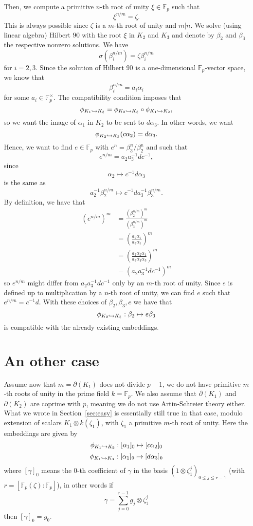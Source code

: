 \documentclass[a4paper,11pt]{article}
\begin{document}
Then, we compute a primitive $n$-th root of unity $\xi\in\mathbb{F}_p$ such that
\[
  \xi^{n/m}=\zeta.
\]
This is always possible since $\zeta$ is a $m$-th root of unity and $m|n$.
We solve (using linear algebra) Hilbert $90$ with the root
$\xi$ in $K_2$ and $K_3$ and denote by $\beta_2$ and $\beta_3$ the respective
nonzero solutions. We have
\[
  \sigma(\beta_i^{n/m})=\zeta\beta_i^{n/m}
\] for $i=2,3$. Since the solution of Hilbert $90$ is a one-dimensional
$\mathbb{F}_p$-vector space, we know that
\[
  \beta_i^{n/m}=a_i\alpha_i
\] for some $a_i\in\mathbb{F}_p^\times$. The compatibility condition imposes that 
\[
  \phi_{K_1\hookrightarrow K_3}=\phi_{K_2\hookrightarrow K_3}\circ\phi_{K_1\hookrightarrow K_2},
\]
so we want the image of $\alpha_1$ in $K_2$ to be sent to $d\alpha_3$. In other
words, we want
\[
  \phi_{K_2\hookrightarrow K_3}(c\alpha_2) = d\alpha_3.
\]
Hence, we want to find $e\in\mathbb{F}_p$ with $e^n=\beta_3^n/\beta_2^n$
and such that
\[
  e^{n/m}=a_2a_3^{-1}dc^{-1},
\]
since 
\[
  \alpha_2\mapsto c^{-1}d\alpha_3
\]
is the same as
\[
  a_2^{-1}\beta_2^{n/m}\mapsto c^{-1}da_3^{-1}\beta_3^{n/m}.
\]
By definition, we have that 
\begin{align*}
  (e^{n/m})^m &= \frac{(\beta_2^{n/m})^m}{(\beta_3^{n/m})^m}\\
  &= \left(\frac{a_2\alpha_2}{a_3\alpha_3}\right)^m\\
  &= \left(\frac{a_2\alpha_2\alpha_1}{a_3\alpha_1\alpha_3}\right)^m\\
  &= \left( a_2a_3^{-1}dc^{-1} \right)^m
\end{align*}
so $e^{n/m}$ might differ from $a_2a_3^{-1}dc^{-1}$ only by an $m$-th root of unity. Since $e$ is defined
up to multiplication by a $n$-th root of unity, we can find $e$ such that
$e^{n/m}=c^{-1}d$. With these choices of $\beta_2, \beta_3, e$ we have that 
\[
  \phi_{K_2\hookrightarrow K_3}:\beta_2\mapsto e\beta_3
\]
is compatible with the already existing embeddings.
\section{An other case}
Assume now that $m=\partial(K_1)$ does not divide $p-1$, \ie we do not have
primitive $m$-th roots of unity in the prime field $k=\mathbb{F}_p$. We also
assume that $\partial(K_1)$ and $\partial(K_2)$ are coprime with $p$, meaning we
do not use Artin-Schreier theory either. What we wrote in
Section~\ref{sec:easy} is essentially still true in that case, modulo extension
of scalars $K_1\otimes k(\zeta_1)$, with $\zeta_1$ a primitive $m$-th root of
unity. Here the
embeddings are given by
\[
  \phi_{K_1\hookrightarrow K_2}:[\alpha_1]_0\mapsto[c\alpha_2]_0
\]
\[
  \phi_{K_1\hookrightarrow K_3}:[\alpha_1]_0\mapsto[d\alpha_3]_0
\]
where $[\gamma]_0$ means the $0$-th coefficient of $\gamma$ in the basis
$(1\otimes\zeta_1^j)_{0\leq j\leq r-1}$ (with
$r=[\mathbb{F}_p(\zeta):\mathbb{F}_p]$), in other words if 
\[
  \gamma=\sum_{j=0}^{r-1}g_j\otimes\zeta_1^j
\]
then $[\gamma]_0=g_0$.
\end{document}
